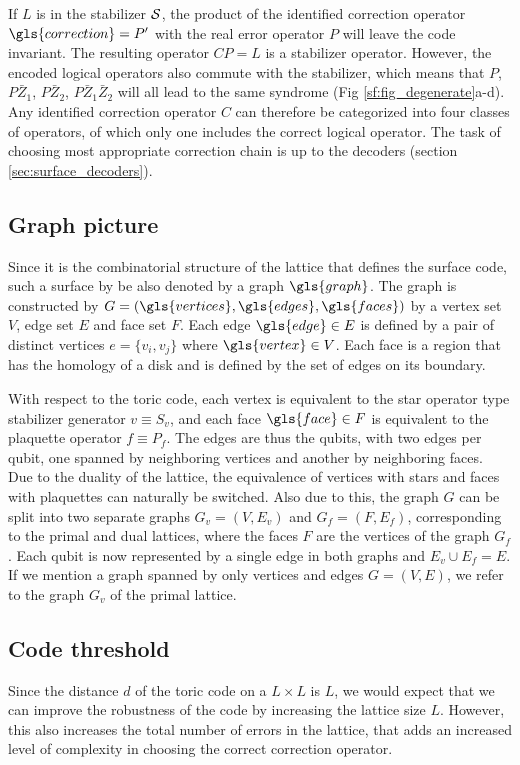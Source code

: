 If $L$ is in the stabilizer $\mathcal{S}$, the product of the identified correction operator $\gls{correction}=P'$ with the real error operator $P$ will leave the code invariant. The resulting operator $CP=L$ is a stabilizer operator. However, the encoded logical operators also commute with the stabilizer, which means that $P$, $P\bar{Z}_1$, $P\bar{Z}_2$, $P\bar{Z}_1\bar{Z}_2$ will all lead to the same syndrome (Fig \ref{sf:fig_degenerate}a-d). Any identified correction operator $C$ can therefore be categorized into four classes of operators, of which only one includes the correct logical operator. The task of choosing most appropriate correction chain is up to the decoders (section \ref{sec:surface_decoders}).

\subsection{Graph picture}\label{sec:toricgraph}
Since it is the combinatorial structure of the lattice that defines the surface code, such a surface by be also denoted by a graph $\gls{graph}$. The graph is constructed by $G=(\gls{vertices}, \gls{edges}, \gls{faces})$ by a vertex set $V$, edge set $E$ and face set $F$. Each edge $\gls{edge}\in E$ is defined by a pair of distinct vertices $e=\{v_i, v_j\}$ where $\gls{vertex}\in V$. Each face is a region that has the homology of a disk and is defined by the set of edges on its boundary. 

With respect to the toric code, each vertex is equivalent to the star operator type stabilizer generator $v\equiv S_v$, and each face $\gls{face}\in F$ is equivalent to the plaquette operator $f\equiv P_f$. The edges are thus the qubits, with two edges per qubit, one spanned by neighboring vertices and another by neighboring faces. Due to the duality of the lattice, the equivalence of vertices with stars and faces with plaquettes can naturally be switched. Also due to this, the graph $G$ can be split into two separate graphs $G_v = (V, E_v)$ and $G_f = (F, E_f)$, corresponding to the primal and dual lattices, where the faces $F$ are the vertices of the graph $G_f$. Each qubit is now represented by a single edge in both graphs and $E_v\cup E_f=E$. If we mention a graph spanned by only vertices and edges $G=(V,E)$, we refer to the graph $G_v$ of the primal lattice. 


\subsection{Code threshold}
Since the distance $d$ of the toric code on a $L\times L$ is $L$, we would expect that we can improve the robustness of the code by increasing the lattice size $L$. However, this also increases the total number of errors in the lattice, that adds an increased level of complexity in choosing the correct correction operator.

